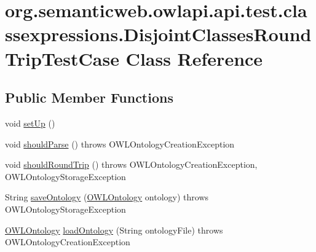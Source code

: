 \hypertarget{classorg_1_1semanticweb_1_1owlapi_1_1api_1_1test_1_1classexpressions_1_1_disjoint_classes_round_trip_test_case}{\section{org.\-semanticweb.\-owlapi.\-api.\-test.\-classexpressions.\-Disjoint\-Classes\-Round\-Trip\-Test\-Case Class Reference}
\label{classorg_1_1semanticweb_1_1owlapi_1_1api_1_1test_1_1classexpressions_1_1_disjoint_classes_round_trip_test_case}
}
\subsection*{Public Member Functions}
\begin{DoxyCompactItemize}
\item 
void \hyperlink{classorg_1_1semanticweb_1_1owlapi_1_1api_1_1test_1_1classexpressions_1_1_disjoint_classes_round_trip_test_case_a59b2ddce4ff968794cbf5a625fe3c46a}{set\-Up} ()
\item 
void \hyperlink{classorg_1_1semanticweb_1_1owlapi_1_1api_1_1test_1_1classexpressions_1_1_disjoint_classes_round_trip_test_case_ac1426af1e56aa3e8f670d6be9f81e9dd}{should\-Parse} ()  throws O\-W\-L\-Ontology\-Creation\-Exception 
\item 
void \hyperlink{classorg_1_1semanticweb_1_1owlapi_1_1api_1_1test_1_1classexpressions_1_1_disjoint_classes_round_trip_test_case_aa636346f4a1fbc9b1ae00792f342febb}{should\-Round\-Trip} ()  throws O\-W\-L\-Ontology\-Creation\-Exception,             O\-W\-L\-Ontology\-Storage\-Exception 
\item 
String \hyperlink{classorg_1_1semanticweb_1_1owlapi_1_1api_1_1test_1_1classexpressions_1_1_disjoint_classes_round_trip_test_case_a4fb716f02ceef616dba5b8879e349a3a}{save\-Ontology} (\hyperlink{interfaceorg_1_1semanticweb_1_1owlapi_1_1model_1_1_o_w_l_ontology}{O\-W\-L\-Ontology} ontology)  throws O\-W\-L\-Ontology\-Storage\-Exception 
\item 
\hyperlink{interfaceorg_1_1semanticweb_1_1owlapi_1_1model_1_1_o_w_l_ontology}{O\-W\-L\-Ontology} \hyperlink{classorg_1_1semanticweb_1_1owlapi_1_1api_1_1test_1_1classexpressions_1_1_disjoint_classes_round_trip_test_case_a5427732b70b35ab810826ffefb8e20b1}{load\-Ontology} (String ontology\-File)  throws O\-W\-L\-Ontology\-Creation\-Exception 
\end{DoxyCompactItemize}


